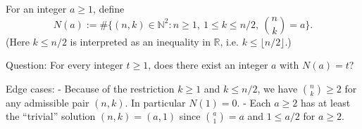 For an integer $a\ge 1$, define
\[
N(a):=\#\{(n,k)\in\mathbb{N}^2: n\ge 1,\ 1\le k\le n/2,\ \binom{n}{k}=a\}.
\]
(Here $k\le n/2$ is interpreted as an inequality in $\mathbb{R}$, i.e. $k\le \lfloor n/2\rfloor$.)

Question: For every integer $t\ge 1$, does there exist an integer $a$ with $N(a)=t$?

Edge cases:
- Because of the restriction $k\ge 1$ and $k\le n/2$, we have $\binom{n}{k}\ge 2$ for any admissible pair $(n,k)$. In particular $N(1)=0$.
- Each $a\ge 2$ has at least the “trivial” solution $(n,k)=(a,1)$ since $\binom{a}{1}=a$ and $1\le a/2$ for $a\ge 2$.
